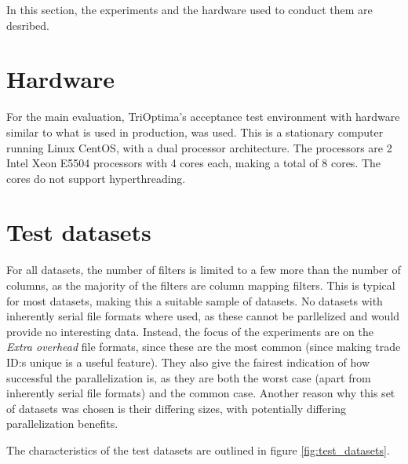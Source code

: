 In this section, the experiments and the hardware used to conduct them are desribed.

\section{Hardware}
For the main evaluation, TriOptima’s acceptance test environment with hardware similar to what is used in production, was used. This is a stationary computer running Linux CentOS,
with a dual processor architecture. The processors are 2 Intel Xeon E5504 processors with 4 cores each, making a total of 8 cores. The cores do not support hyperthreading.

\section{Test datasets}
For all datasets, the number of filters is limited to a few more than the number of columns, as the majority of the filters are column mapping filters.
This is typical for most datasets, making this a suitable sample of datasets. No datasets with inherently serial file formats where used, as these cannot be
parllelized and would provide no interesting data. Instead, the focus of the experiments are on the \textit{Extra overhead} file formats, since these are the
most common (since making trade ID:s unique is a useful feature). They also give the fairest indication of how successful the parallelization is, as they are
both the worst case (apart from inherently serial file formats) and the common case. Another reason why this set of datasets was chosen is their differing sizes,
with potentially differing parallelization benefits.

The characteristics of the test datasets are outlined in figure \ref{fig:test_datasets}.

